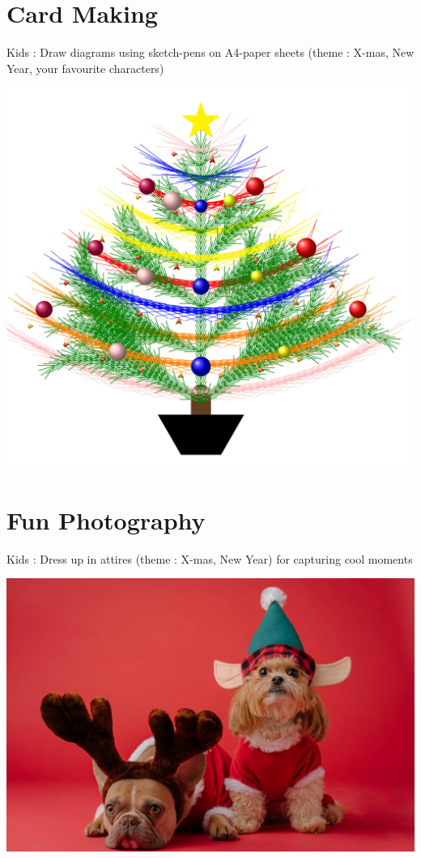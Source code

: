 \documentclass[makeidx, 11pt, oneside, onecolumn, openright, final, svgnames, dvipsnames, extrafontsizes]{memoir}
\begin{document}
 
 

\mainmatter
\pagestyle{companion}
\setlength{\headwidth}{\textwidth}
\setlength{\headwidth}{\textwidth}

\renewcommand{\chaptername}{Celebration}

\chapter{Card Making}
\thispagestyle{empty}

Kids : Draw diagrams using sketch-pens on A4-paper sheets (theme : X-mas, New Year, your favourite characters)
\begin{center}
\includegraphics[scale=1]{christmas-tree.jpeg}
\end{center}

\chapter{Fun Photography}
\thispagestyle{empty}

Kids : Dress up in attires (theme : X-mas, New Year) for capturing cool moments 

\begin{center}
\includegraphics[scale=1]{dog.jpeg}
\end{center}
\end{document}
